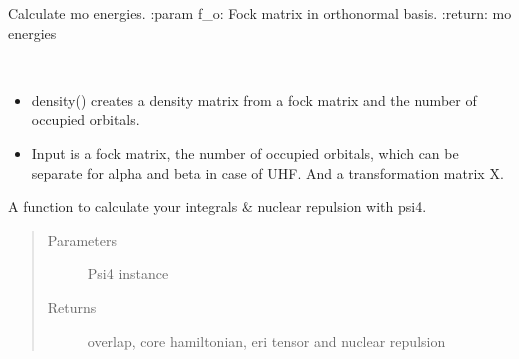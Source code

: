 \documentclass[letterpaper,10pt,english]{sphinxmanual}
\begin{document}

\begin{fulllineitems}
\label{\detokenize{SCF_functions:hf.utilities.SCF_functions.calc_mo_e}}
Calculate mo energies.
:param f\_o: Fock matrix in orthonormal basis.
:return: mo energies

\end{fulllineitems}


\begin{fulllineitems}
\label{\detokenize{SCF_functions:hf.utilities.SCF_functions.density_matrix}}~\begin{itemize}
\item {} 
density() creates a density matrix from a fock matrix and the number of occupied orbitals.

\item {} 
Input is a fock matrix, the number of occupied orbitals, which can be separate for alpha and beta in case of UHF.
And a transformation matrix X.

\end{itemize}

\end{fulllineitems}


\begin{fulllineitems}
\label{\detokenize{SCF_functions:hf.utilities.SCF_functions.get_integrals_psi4}}
A function to calculate your integrals \& nuclear repulsion with psi4.
\begin{quote}\begin{description}
\item[{Parameters}] \leavevmode
{} \textendash{} Psi4 instance

\item[{Returns}] \leavevmode
overlap, core hamiltonian, eri tensor and nuclear repulsion

\end{description}\end{quote}

\end{fulllineitems}
\end{document}

